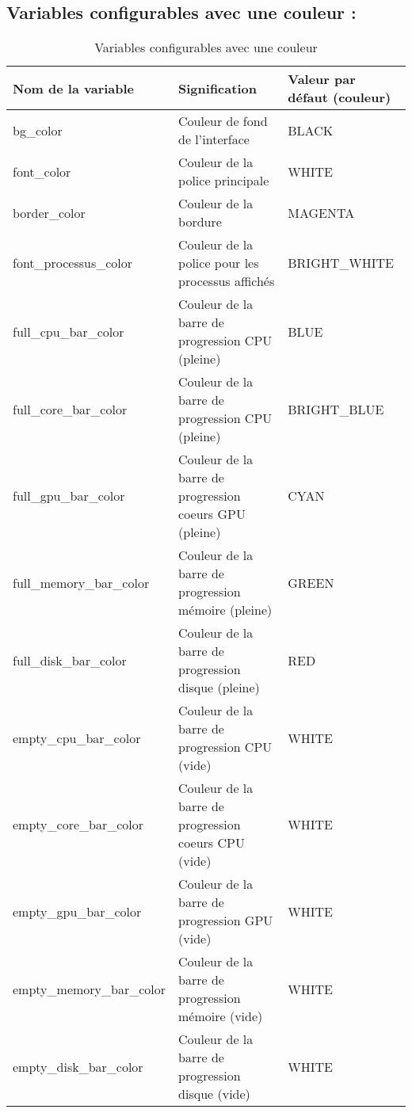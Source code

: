 \documentclass{article}
\begin{document}
\subsection{Variables configurables avec une couleur :}
\begin{table}[h!]
    \centering
    \renewcommand{\arraystretch}{1.5}
    \footnotesize
    \begin{tabular}{|>{\centering\arraybackslash}m{3.5cm}|>{\centering\arraybackslash}m{3.8cm}|>{\centering\arraybackslash}m{3cm}|}
        \hline
        \textbf{Nom de la variable} & \textbf{Signification} & \textbf{Valeur par défaut (couleur)} \\
        \hline
        bg\_color & Couleur de fond de l'interface & BLACK \\
        \hline
        font\_color & Couleur de la police principale & WHITE \\
        \hline
        border\_color & Couleur de la bordure & MAGENTA \\
        \hline
        font\_processus\_color & Couleur de la police pour les processus affichés & BRIGHT\_WHITE \\
        \hline
        full\_cpu\_bar\_color & Couleur de la barre de progression CPU (pleine) & BLUE \\
        \hline
        full\_core\_bar\_color & Couleur de la barre de progression CPU (pleine) & BRIGHT\_BLUE \\
        \hline
        full\_gpu\_bar\_color & Couleur de la barre de progression coeurs GPU (pleine) & CYAN \\
        \hline
        full\_memory\_bar\_color & Couleur de la barre de progression mémoire (pleine) & GREEN \\
        \hline
        full\_disk\_bar\_color & Couleur de la barre de progression disque (pleine) & RED \\
        \hline
        empty\_cpu\_bar\_color & Couleur de la barre de progression CPU (vide) & WHITE \\
        \hline
        empty\_core\_bar\_color & Couleur de la barre de progression coeurs CPU (vide) & WHITE \\
        \hline
        empty\_gpu\_bar\_color & Couleur de la barre de progression GPU (vide) & WHITE \\
        \hline
        empty\_memory\_bar\_color & Couleur de la barre de progression mémoire (vide) & WHITE \\
        \hline
        empty\_disk\_bar\_color & Couleur de la barre de progression disque (vide) & WHITE \\
        \hline
    \end{tabular}
    \label{tab:configable_color_var}
    \caption{Variables configurables avec une couleur}
\end{table}
\end{document}
